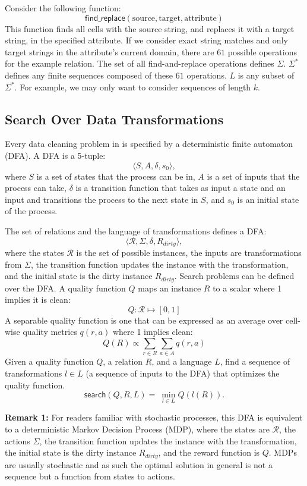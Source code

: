 \noindent Consider the following function:
\[
\textsf{find\_replace}(\text{source}, \text{target}, \text{attribute})
\]
This function finds all cells with the source string, and replaces it with a target string, in the specified attribute.
If we consider exact string matches and only target strings in the attribute's current domain, there are $61$ possible operations for the example relation.
The set of all find-and-replace operations defines $\Sigma$.
$\Sigma^*$ defines any finite sequences composed of these $61$ operations.
$L$ is any subset of $\Sigma^*$. 
For example, we may only want to consider sequences of length $k$.


\subsection{Search Over Data Transformations}
Every data cleaning problem in \sys is specified by a deterministic finite automaton (DFA). 
A DFA is a 5-tuple:
\[\langle S, A, \delta, s_0\rangle,\]
where $S$ is a set of states that the process can be in, $A$ is a set of inputs that the process can take, $\delta$ is a transition function that takes as input a state and an input and transitions the process to the next state in $S$, and $s_0$ is an initial state of the process.

The set of relations and the language of transformations defines a DFA:
\[\langle \mathcal{R}, \Sigma, \delta, R_{dirty}\rangle, \]
where the states $\mathcal{R}$ is the set of possible instances, the inputs are transformations from $\Sigma$, the transition function updates the instance with the transformation, and the initial state is the dirty instance $R_{dirty}$. Search problems can be defined over the DFA. 
A quality function $Q$ maps an instance $R$ to a scalar where 1 implies it is clean:
\[
Q: \mathcal{R} \mapsto [0,1]
\]
A separable quality function is one that can be expressed as an average over cell-wise quality metrics $q(r,a)$ where 1 implies clean:
\[
Q(R) \propto \sum_{r \in R} \sum_{a \in A} q(r,a)
\]
Given a quality function $Q$, a relation $R$, and a language $L$, find a sequence of transformations $l \in L$ (a sequence of inputs to the DFA) that optimizes the quality function.
\[
\textsf{search}(Q,R,L) = ~ \min_{l \in L} Q( l(R) ).  
\]

\vspace{0.5em} \noindent \textbf{Remark 1: } For readers familiar with stochastic processes, this DFA is equivalent to a deterministic Markov Decision Process (MDP), where the states are $\mathcal{R}$, the actions $\Sigma$, the transition function updates the instance with the transformation, the initial state is the dirty instance $R_{dirty}$, and the reward function is $Q$. MDPs are usually stochastic and as such the optimal solution in general is not a sequence but a function from states to actions.


